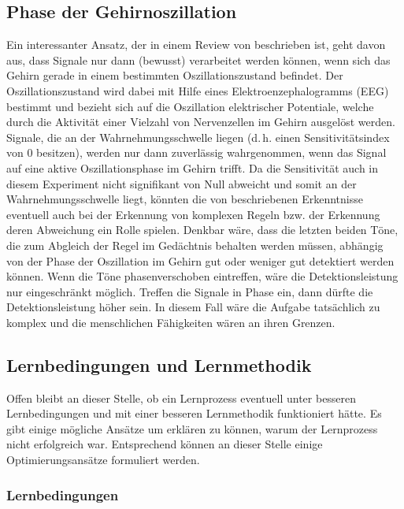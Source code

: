 \documentclass[doc,a4paper,12pt]{apa6}
\begin{document}
\subsection{Phase der Gehirnoszillation}

Ein interessanter Ansatz, der in einem Review von \textcite{vanrullen2011ongoing} beschrieben ist, geht davon aus, dass Signale nur dann (bewusst) verarbeitet werden können, wenn sich das Gehirn gerade in einem bestimmten Oszillationszustand befindet. Der Oszillationszustand wird dabei mit Hilfe eines Elektroenzephalogramms (EEG) bestimmt und bezieht sich auf die Oszillation elektrischer Potentiale, welche durch die Aktivität einer Vielzahl von Nervenzellen im Gehirn ausgelöst werden. Signale, die an der Wahrnehmungsschwelle liegen (d.\,h. einen Sensitivitätsindex von 0 besitzen), werden nur dann zuverlässig wahrgenommen, wenn das Signal auf eine aktive Oszillationsphase im Gehirn trifft. Da die Sensitivität auch in diesem Experiment nicht signifikant von Null abweicht und somit an der Wahrnehmungsschwelle liegt, könnten die von \textcite{vanrullen2011ongoing} beschriebenen Erkenntnisse eventuell auch bei der Erkennung von komplexen Regeln bzw. der Erkennung deren Abweichung ein Rolle spielen. Denkbar wäre, dass die letzten beiden Töne, die zum Abgleich der Regel im Gedächtnis behalten werden müssen, abhängig von der Phase der Oszillation im Gehirn gut oder weniger gut detektiert werden können. Wenn die Töne phasenverschoben eintreffen, wäre die Detektionsleistung nur eingeschränkt möglich. Treffen die Signale in Phase ein, dann dürfte die Detektionsleistung höher sein. In diesem Fall wäre die Aufgabe tatsächlich zu komplex und die menschlichen Fähigkeiten wären an ihren Grenzen.

\subsection{Lernbedingungen und Lernmethodik}

Offen bleibt an dieser Stelle, ob ein Lernprozess eventuell unter besseren Lernbedingungen und mit einer besseren Lernmethodik funktioniert hätte. Es gibt einige mögliche Ansätze um erklären zu können, warum der Lernprozess nicht erfolgreich war. Entsprechend können an dieser Stelle einige Optimierungsansätze formuliert werden.

\subsubsection{Lernbedingungen}
\end{document}
